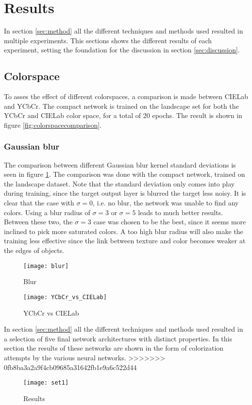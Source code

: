 \section{Results}\label{sec:results}

In section \ref{sec:method} all the different techniques and methods used resulted in multiple experiments. This sections shows the different results of each experiment, setting the foundation for the discussion in section \ref{sec:discussion}.

\subsection{Colorspace}
To asses the effect of different colorspaces, a comparison is made between CIELab and YCbCr. The compact network is trained on the landscape set for both the YCbCr and CIELab color space, for a total of 20 epochs. The result is shown in figure \ref{fig:colorspacecomparison}.

\subsubsection{Gaussian blur}
The comparison between different Gaussian blur kernel standard deviations is seen in figure \ref{fig:blur}. The comparison was done with the compact network, trained on the landscape dataset. Note that the standard deviation only comes into play during training, since the target output layer is blurred the target less noisy. It is clear that the case with $\sigma=0$, i.e. no blur, the network was unable to find any colors. Using a blur radius of $\sigma=3$ or $\sigma=5$ leads to much better results. Between these two, the $\sigma=3$ case was chosen to be the best, since it seems more inclined to pick more saturated colors. A too high blur radius will also make the training less effective since the link between texture and color becomes weaker at the edges of objects.

\begin{figure}[h]
	\centering
	\texttt{[image: blur]}
	\caption{Blur}
	\label{fig:blur}
\end{figure}

\begin{figure}[h]
	\centering
	\texttt{[image: YCbCr\_vs\_CIELab]}
	\caption{YCbCr vs CIELab}
	\label{fig:YCbCr_vs_CIELab}
\end{figure}

In section \ref{sec:method} all the different techniques and methods used resulted in a selection of five final network architectures with distinct properties. In this section the results of these networks are shown in the form of colorization attempts by the various neural networks. 
>>>>>>> 0fb8ba3a2a9f4cb09685a31642fb1e9a6c522d44

\begin{figure}[h]
	\centering
	\texttt{[image: set1]}
	\caption{Results}
	\label{fig:results}
\end{figure}


